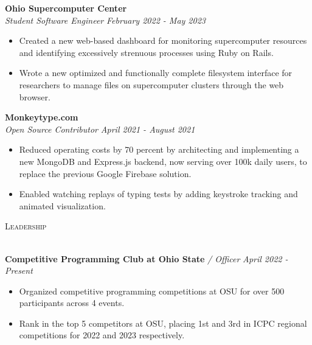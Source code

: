 \documentclass[letterpaper]{article}
\newcommand{\lineunder} {
    \vspace*{-8pt} \\
    \hspace*{-18pt} \hrulefill \\
}
\newcommand{\header} [1] {
    {\hspace*{-18pt}\vspace*{6pt} \textsc{#1}}
    \vspace*{-6pt} \lineunder
}
\begin{document}
    \textbf{Ohio Supercomputer Center}\\
    
    \textit{Student Software Engineer} \hfill \textsl{February 2022 - May 2023}\\
    \vspace{-7pt}
    \begin{itemize} \itemsep -1mm
        
            \item Created a new web-based dashboard for monitoring supercomputer resources and identifying excessively strenuous processes using Ruby on Rails.

            \item Wrote a new optimized and functionally complete filesystem interface for researchers to manage files on supercomputer clusters through the web browser.

    \end{itemize}
    \vspace{-2mm}

    	\textbf{Monkeytype.com}\\
    
    \textit{Open Source Contributor} \hfill \textsl{April 2021 - August 2021}\\
    \vspace{-7pt}
    \begin{itemize} \itemsep -1mm
            \item Reduced operating costs by 70 percent by architecting and implementing a new MongoDB and Express.js backend, now serving over 100k daily users, to replace the previous Google Firebase solution.

            \item Enabled watching replays of typing tests by adding keystroke tracking and animated visualization.

    \end{itemize}
    \vspace{-2mm}

\header{Leadership}
\vspace{1mm}

    \textbf{Competitive Programming Club at Ohio State} \textit{/ Officer} \hfill \textsl{April 2022 - Present}\\
    \vspace{-2mm}
    \begin{itemize} \itemsep -1mm
    
        \item Organized competitive programming competitions at OSU for over 500 participants across 4 events.
    
        \item Rank in the top 5 competitors at OSU, placing 1st and 3rd in ICPC regional competitions for 2022 and 2023 respectively.
    
    \end{itemize}
    \vspace{-1mm}
\end{document}
